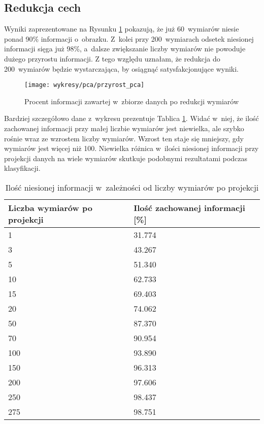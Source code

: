 \documentclass[12pt]{article}
\begin{document}
\subsection{Redukcja cech}
Wyniki zaprezentowane na Rysunku \ref{fig:przyrost pca} pokazują, że już 60~wymiarów niesie ponad 90\% informacji o~obrazku. Z~kolei przy 200~wymiarach odsetek niesionej informacji sięga już 98\%, a~dalsze zwiększanie liczby wymiarów
nie powoduje dużego przyrostu informacji. Z tego względu uznałam, że redukcja do 200~wymiarów będzie wystarczająca, by osiągnąć satysfakcjonujące wyniki.
\begin{figure}[H]
 \centering
 \texttt{[image: wykresy/pca/przyrost\_pca]}
 \caption{Procent informacji zawartej w~zbiorze danych po redukcji wymiarów}
\label{fig:przyrost pca}
\end{figure}

Bardziej szczegółowo dane z~wykresu prezentuje Tablica \ref{tab: dokladnosc pca}. Widać w~niej, że ilość zachowanej informacji przy małej liczbie wymiarów jest niewielka, ale szybko rośnie wraz ze wzrostem liczby wymiarów. Wzrost
ten staje się mniejszy, gdy wymiarów jest więcej niż 100. Niewielka różnica w~ilości niesionej informacji przy projekcji danych na wiele wymiarów skutkuje podobnymi rezultatami podczas klasyfikacji.
\begin{table}
\begin{center}
  \begin{tabular}[H]{|l|l|}
  \hline 
  \rowcolor[gray]{0.9} Liczba wymiarów po projekcji & Ilość zachowanej informacji [\%] \\ \hline \hline
  1 & 31.774 \\ \hline 
  3 & 43.267 \\ \hline 
  5 & 51.340 \\ \hline 
  10 & 62.733 \\ \hline 
  15 & 69.403 \\ \hline 
  20 & 74.062 \\ \hline 
  50 & 87.370 \\ \hline 
  70 & 90.954 \\ \hline 
  100 & 93.890 \\ \hline 
  150 & 96.313 \\ \hline 
  200 & 97.606 \\ \hline 
  250 & 98.437 \\ \hline 
  275 & 98.751 \\ \hline 
  \end{tabular} 
\end{center}
 \caption{Ilość niesionej informacji w~zależności od liczby wymiarów po projekcji} 
\label{tab: dokladnosc pca}
\end{table}
\end{document}
